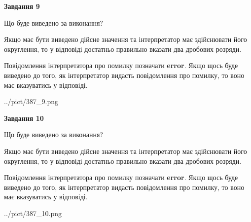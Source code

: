 \documentclass[12pt, ukrainian]{article}
\begin{document}
{\begin {Large}
{\begin {center}\textbf{Завдання 9}\end {center}}\par
Що буде виведено за виконання? \par

Якщо має бути виведено дійсне значення та інтерпретатор має здійснювати його округлення, 
то у відповіді достатньо правильно вказати два дробових розряди.

Повідомлення інтерпретатора про помилку позначати \textbf{error}.
Якщо щось буде виведено до того, як інтерпретатор видасть повідомлення про помилку, 
то воно має вказуватись у відповіді. \par

\begin{center}
	{../pict/387_9.png}
\end{center}
\newpage

{\begin {center}\textbf{Завдання 10}\end {center}}\par
Що буде виведено за виконання? \par

Якщо має бути виведено дійсне значення та інтерпретатор має здійснювати його округлення, 
то у відповіді достатньо правильно вказати два дробових розряди.

Повідомлення інтерпретатора про помилку позначати \textbf{error}.
Якщо щось буде виведено до того, як інтерпретатор видасть повідомлення про помилку, 
то воно має вказуватись у відповіді. \par

\begin{center}
	{../pict/387_10.png}
\end{center}
\newpage

\end {Large}}
\end{document}
